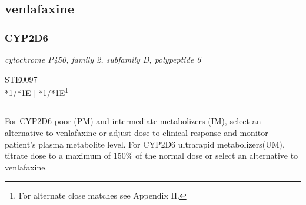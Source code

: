 \documentclass{report}
\begin{document}
\subsection{ venlafaxine }

\subsubsection{ CYP2D6 }
     \textit{ cytochrome P450, family 2, subfamily D, polypeptide 6 } \begin{flushright} \textsc{ STE0097 \\ *1/*1E  | *1/*1E\footnote{For alternate close matches see Appendix II.} }\end{flushright}
      \hrule \vspace{6pt}
      For CYP2D6 poor (PM) and intermediate metabolizers (IM), select an alternative to venlafaxine or adjust dose to clinical response and monitor patient's plasma metabolite level. For CYP2D6 ultrarapid metabolizers(UM), titrate dose to a maximum of 150\% of the normal dose or select an alternative to venlafaxine. \newline
      \scriptsize
      
\end{document}
